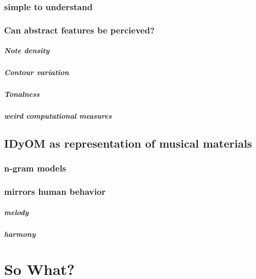 \documentclass[]{book}
\let\oldsubparagraph\subparagraph
\renewcommand{\subparagraph}[1]{\oldsubparagraph{#1}\mbox{}}
\theoremstyle{definition}
\theoremstyle{definition}
\theoremstyle{definition}
\theoremstyle{remark}
\begin{document}
\hypertarget{simple-to-understand}{%
\subsubsection{simple to understand}\label{simple-to-understand}}

\hypertarget{can-abstract-features-be-percieved}{%
\subsubsection{Can abstract features be
percieved?}\label{can-abstract-features-be-percieved}}

\hypertarget{note-density}{%
\subparagraph{Note density}\label{note-density}}

\hypertarget{contour-variation}{%
\subparagraph{Contour variation}\label{contour-variation}}

\hypertarget{tonalness}{%
\subparagraph{Tonalness}\label{tonalness}}

\hypertarget{weird-computational-measures}{%
\subparagraph{weird computational
measures}\label{weird-computational-measures}}

\hypertarget{idyom-as-representation-of-musical-materials}{%
\subsection{IDyOM as representation of musical
materials}\label{idyom-as-representation-of-musical-materials}}

\hypertarget{n-gram-models}{%
\subsubsection{n-gram models}\label{n-gram-models}}

\hypertarget{mirrors-human-behavior}{%
\subsubsection{mirrors human behavior}\label{mirrors-human-behavior}}

\hypertarget{melody}{%
\subparagraph{melody}\label{melody}}

\hypertarget{harmony}{%
\subparagraph{harmony}\label{harmony}}

\hypertarget{so-what}{%
\section{So What?}\label{so-what}}
\end{document}
